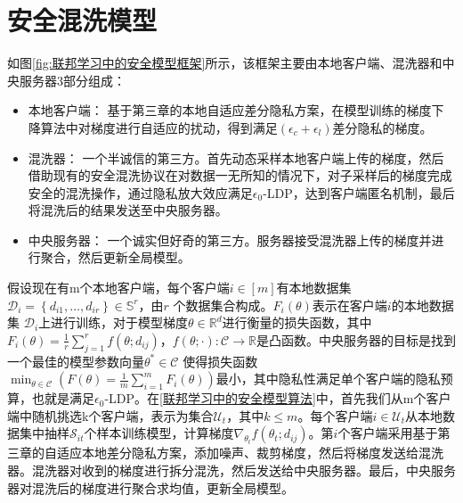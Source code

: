 \section{安全混洗模型}
如图\ref{fig:联邦学习中的安全模型框架}所示，该框架主要由本地客户端、混洗器和中央服务器3部分组成：
\begin{itemize}
  \item 本地客户端： 基于第三章的本地自适应差分隐私方案，在模型训练的梯度下降算法中对梯度进行自适应的扰动，得到满足$\left(\epsilon_{c}+\epsilon_{l}\right)$差分隐私的梯度。
  \item 混洗器： 一个半诚信的第三方。首先动态采样本地客户端上传的梯度，然后借助现有的安全混洗协议在对数据一无所知的情况下，对子采样后的梯度完成安全的混洗操作，通过隐私放大效应满足$\epsilon_{0}$-LDP，达到客户端匿名机制，最后将混洗后的结果发送至中央服务器。
  \item 中央服务器： 一个诚实但好奇的第三方。服务器接受混洗器上传的梯度并进行聚合，然后更新全局模型。
\end{itemize}

假设现在有m个本地客户端，每个客户端$i \in[m]$有本地数据集\\$\mathcal{D}_{i}=\left\{d_{i 1}, \ldots, d_{i r}\right\} \in \mathbb{S}^{r}$，由$r$ 个数据集合构成。$F_{i}(\theta)$表示在客户端$i$的本地数据集 $\mathcal{D}_{i}$上进行训练，对于模型梯度$\theta \in \mathbb{R}^{d}$进行衡量的损失函数，其中$F_{i}(\theta)=\frac{1}{r} \sum_{j=1}^{r} f\left(\theta ; d_{i j}\right)$，$f(\theta ; \cdot): \mathcal{C} \rightarrow \mathbb{R}$是凸函数。中央服务器的目标是找到一个最佳的模型参数向量$\theta^{*} \in \mathcal{C}$ 使得损失函数$\min _{\theta \in \mathcal{C}}\left(F(\theta)=\frac{1}{m} \sum_{i=1}^{m} F_{i}(\theta)\right)$最小，其中隐私性满足单个客户端的隐私预算，也就是满足$\epsilon_{0}$-LDP。在\ref{联邦学习中的安全模型算法}中，首先我们从m个客户端中随机挑选k个客户端，表示为集合$\mathcal{U}_{t}$，其中$k \leq m$。每个客户端$i \in \mathcal{U}_{t}$从本地数据集中抽样$\mathcal{S}_{i t}$个样本训练模型，计算梯度$\nabla_{\theta_{t}} f\left(\theta_{t} ; d_{i j}\right)$。第$i$个客户端采用基于第三章的自适应本地差分隐私方案，添加噪声、裁剪梯度，然后将梯度发送给混洗器。混洗器对收到的梯度进行拆分混洗，然后发送给中央服务器。最后，中央服务器对混洗后的梯度进行聚合求均值，更新全局模型。

